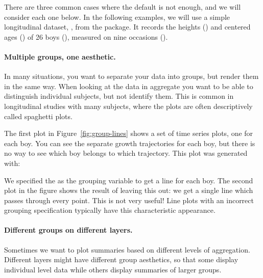There are three common cases where the default is not enough, and we will consider each one below.  In the following examples, we will use a simple longitudinal dataset, , from the  package.  It records the heights () and centered ages () of 26 boys (), measured on nine occasions (). 

\paragraph{Multiple groups, one aesthetic.} In many situations, you want to separate your data into groups, but render them in the same way.  When looking at the data in aggregate you want to be able to distinguish individual subjects, but not identify them.  This is common in longitudinal studies with many subjects, where the plots are often descriptively called spaghetti plots.  

The first plot in Figure~\ref{fig:group-lines} shows a set of time series plots, one for each boy. You can see the separate growth trajectories for each boy, but there is no way to see which boy belongs to which trajectory.  This plot was generated with:

%


\noindent We specified the  as the grouping variable to get a line for each boy. The second plot in the figure shows the result of leaving this out: we get a single line which passes through every point.  This is not very useful! Line plots with an incorrect grouping specification typically have this characteristic appearance.

% 


\paragraph{Different groups on different layers.}  Sometimes we want to plot summaries based on different levels of aggregation. Different layers might have different group aesthetics, so that some display individual level data while others display summaries of larger groups.

